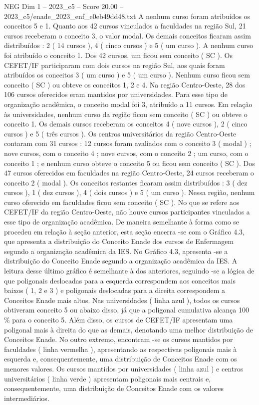 \begin{textsample}{NEG Dim 1 – 2023\_c5 – Score 20.00 – 2023\_c5/enade\_2023\_enf\_e0eb49dd48.txt}
A nenhum curso foram atribuídos os conceitos 5 e 1.
Quanto aos 42 cursos vinculados a faculdades na região Sul, 21 cursos receberam o conceito 3, o valor modal.
Os demais conceitos ficaram assim distribuídos : 2 ( 14 cursos ), 4 ( cinco cursos ) e 5 ( um curso ).
A nenhum curso foi atribuído o conceito 1.
Dos 42 cursos, um ficou sem conceito ( SC ).
Os CEFET/IF participaram com dois cursos na região Sul, aos quais foram atribuídos os conceitos 3 ( um curso ) e 5 ( um curso ).
Nenhum curso ficou sem conceito ( SC ) ou obteve os conceitos 1, 2 e 4.
Na região Centro-Oeste, 28 dos 106 cursos oferecidos eram mantidos por universidades.
Para esse tipo de organização acadêmica, o conceito modal foi 3, atribuído a 11 cursos.
Em relação às universidades, nenhum curso da região ficou sem conceito ( SC ) ou obteve o conceito 1.
Os demais cursos receberam os conceitos 4 ( nove cursos ), 2 ( cinco cursos ) e 5 ( três cursos ).
Os centros universitários da região Centro-Oeste contaram com 31 cursos : 12 cursos foram avaliados com o conceito 3 ( modal ) ; nove cursos, com o conceito 4 ; nove cursos, com o conceito 2 ; um curso, com o conceito 1 ; e nenhum curso obteve o conceito 5 ou ficou sem conceito ( SC ).
Dos 47 cursos oferecidos em faculdades na região Centro-Oeste, 24 cursos receberam o conceito 2 ( modal ).
Os conceitos restantes ficaram assim distribuídos : 3 ( dez cursos ), 1 ( dez cursos ), 4 ( dois cursos ) e 5 ( um curso ).
Nessa região, nenhum curso oferecido em faculdades ficou sem conceito ( SC ).
No que se refere aos CEFET/IF da região Centro-Oeste, não houve cursos participantes vinculados a esse tipo de organização acadêmica.
De maneira semelhante à forma como se procedeu em relação à seção anterior, esta seção encerra -se com o Gráfico 4.3, que apresenta a distribuição do Conceito Enade dos cursos de Enfermagem segundo a organização acadêmica da IES.
No Gráfico 4.3, apresenta -se a distribuição do Conceito Enade segundo a organização acadêmica da IES.
A leitura desse último gráfico é semelhante à dos anteriores, seguindo -se a lógica de que poligonais deslocadas para a esquerda correspondem aos conceitos mais baixos ( 1, 2 e 3 ) e poligonais deslocadas para a direita correspondem a Conceitos Enade mais altos.
Nas universidades ( linha azul ), todos os cursos obtiveram conceito 5 ou abaixo disso, já que a poligonal cumulativa alcança 100 \% para o conceito 5.
Além disso, os cursos de CEFET/IF apresentam uma poligonal mais à direita do que as demais, denotando uma melhor distribuição de Conceitos Enade.
No outro extremo, encontram -se os cursos mantidos por faculdades ( linha vermelha ), apresentando as respectivas poligonais mais à esquerda e, consequentemente, uma distribuição de Conceitos Enade com os menores valores.
Os cursos mantidos por universidades ( linha azul ) e centros universitários ( linha verde ) apresentam poligonais mais centrais e, consequentemente, uma distribuição de Conceitos Enade com os valores intermediários.

\end{textsample}

